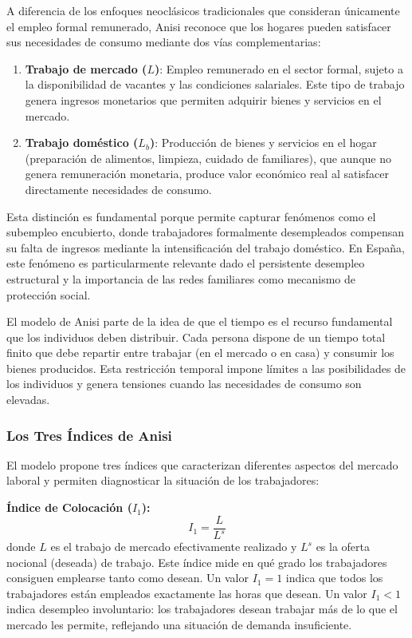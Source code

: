 A diferencia de los enfoques neoclásicos tradicionales que consideran únicamente el empleo formal remunerado, Anisi reconoce que los hogares pueden satisfacer sus necesidades de consumo mediante dos vías complementarias:

\begin{enumerate}
    \item \textbf{Trabajo de mercado ($L$)}: Empleo remunerado en el sector formal, sujeto a la disponibilidad de vacantes y las condiciones salariales. Este tipo de trabajo genera ingresos monetarios que permiten adquirir bienes y servicios en el mercado.
    \item \textbf{Trabajo doméstico ($L_b$)}: Producción de bienes y servicios en el hogar (preparación de alimentos, limpieza, cuidado de familiares), que aunque no genera remuneración monetaria, produce valor económico real al satisfacer directamente necesidades de consumo.
\end{enumerate}

Esta distinción es fundamental porque permite capturar fenómenos como el subempleo encubierto, donde trabajadores formalmente desempleados compensan su falta de ingresos mediante la intensificación del trabajo doméstico. En España, este fenómeno es particularmente relevante dado el persistente desempleo estructural y la importancia de las redes familiares como mecanismo de protección social.

El modelo de Anisi parte de la idea de que el tiempo es el recurso fundamental que los individuos deben distribuir. Cada persona dispone de un tiempo total finito que debe repartir entre trabajar (en el mercado o en casa) y consumir los bienes producidos. Esta restricción temporal impone límites a las posibilidades de los individuos y genera tensiones cuando las necesidades de consumo son elevadas.

\subsubsection{Los Tres Índices de Anisi}

El modelo propone tres índices que caracterizan diferentes aspectos del mercado laboral y permiten diagnosticar la situación de los trabajadores:

\textbf{Índice de Colocación ($I_1$):}
\begin{equation}
I_1 = \frac{L}{L^s}
\end{equation}
donde $L$ es el trabajo de mercado efectivamente realizado y $L^s$ es la oferta nocional (deseada) de trabajo. Este índice mide en qué grado los trabajadores consiguen emplearse tanto como desean. Un valor $I_1 = 1$ indica que todos los trabajadores están empleados exactamente las horas que desean. Un valor $I_1 < 1$ indica desempleo involuntario: los trabajadores desean trabajar más de lo que el mercado les permite, reflejando una situación de demanda insuficiente.

